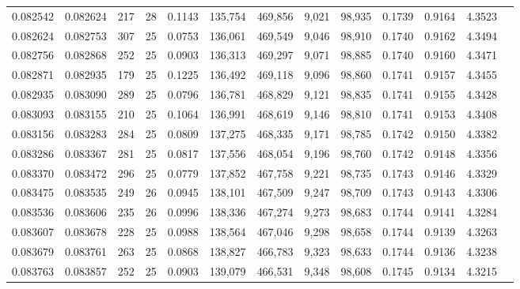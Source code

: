 \begin{tabular}{rrrrrrrrrrrrr}
0.082542 & 0.082624 & 217 &  28 &                                     0.1143 & 135,754 & 469,856 &   9,021 &  98,935 & 0.1739 & 0.9164 & 4.3523 \\
0.082624 & 0.082753 & 307 &  25 &                                     0.0753 & 136,061 & 469,549 &   9,046 &  98,910 & 0.1740 & 0.9162 & 4.3494 \\
0.082756 & 0.082868 & 252 &  25 &                                     0.0903 & 136,313 & 469,297 &   9,071 &  98,885 & 0.1740 & 0.9160 & 4.3471 \\
0.082871 & 0.082935 & 179 &  25 &                                     0.1225 & 136,492 & 469,118 &   9,096 &  98,860 & 0.1741 & 0.9157 & 4.3455 \\
0.082935 & 0.083090 & 289 &  25 &                                     0.0796 & 136,781 & 468,829 &   9,121 &  98,835 & 0.1741 & 0.9155 & 4.3428 \\
0.083093 & 0.083155 & 210 &  25 &                                     0.1064 & 136,991 & 468,619 &   9,146 &  98,810 & 0.1741 & 0.9153 & 4.3408 \\
0.083156 & 0.083283 & 284 &  25 &                                     0.0809 & 137,275 & 468,335 &   9,171 &  98,785 & 0.1742 & 0.9150 & 4.3382 \\
0.083286 & 0.083367 & 281 &  25 &                                     0.0817 & 137,556 & 468,054 &   9,196 &  98,760 & 0.1742 & 0.9148 & 4.3356 \\
0.083370 & 0.083472 & 296 &  25 &                                     0.0779 & 137,852 & 467,758 &   9,221 &  98,735 & 0.1743 & 0.9146 & 4.3329 \\
0.083475 & 0.083535 & 249 &  26 &                                     0.0945 & 138,101 & 467,509 &   9,247 &  98,709 & 0.1743 & 0.9143 & 4.3306 \\
0.083536 & 0.083606 & 235 &  26 &                                     0.0996 & 138,336 & 467,274 &   9,273 &  98,683 & 0.1744 & 0.9141 & 4.3284 \\
0.083607 & 0.083678 & 228 &  25 &                                     0.0988 & 138,564 & 467,046 &   9,298 &  98,658 & 0.1744 & 0.9139 & 4.3263 \\
0.083679 & 0.083761 & 263 &  25 &                                     0.0868 & 138,827 & 466,783 &   9,323 &  98,633 & 0.1744 & 0.9136 & 4.3238 \\
0.083763 & 0.083857 & 252 &  25 &                                     0.0903 & 139,079 & 466,531 &   9,348 &  98,608 & 0.1745 & 0.9134 & 4.3215 \\

\end{tabular}
